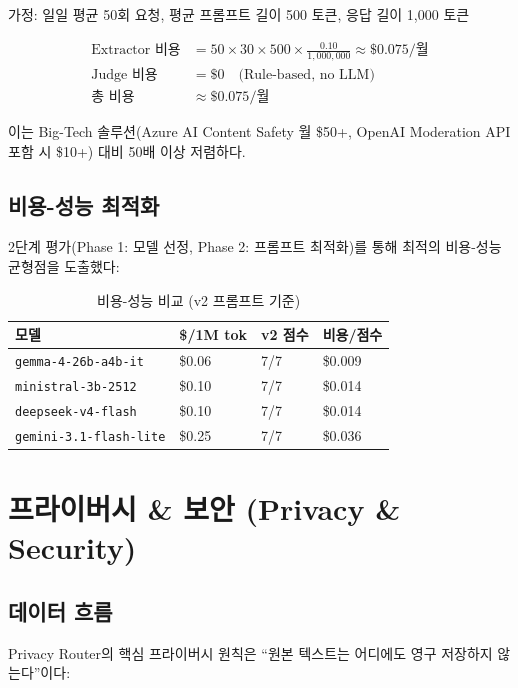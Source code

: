 \documentclass[11pt,a4paper]{article}
\begin{document}
가정: 일일 평균 50회 요청, 평균 프롬프트 길이 500 토큰, 응답 길이 1,000 토큰

\begin{align*}
\text{Extractor 비용} &= 50 \times 30 \times 500 \times \frac{0.10}{1{,}000{,}000} \approx \$0.075/\text{월} \\
\text{Judge 비용} &= \$0 \quad \text{(Rule-based, no LLM)} \\
\text{총 비용} &\approx \$0.075/\text{월}
\end{align*}

이는 Big-Tech 솔루션(Azure AI Content Safety 월 \$50+, OpenAI Moderation API 포함 시 \$10+) 대비 50배 이상 저렴하다.

\subsection{비용-성능 최적화}

2단계 평가(Phase 1: 모델 선정, Phase 2: 프롬프트 최적화)를 통해 최적의 비용-성능 균형점을 도출했다:

\begin{table}[h]
\centering
\begin{tabular}{@{}llll@{}}
\toprule
모델 & \$/1M tok & v2 점수 & 비용/점수 \\
\midrule
\texttt{gemma-4-26b-a4b-it} & \$0.06 & 7/7 & \$0.009 \\
\texttt{ministral-3b-2512} & \$0.10 & 7/7 & \$0.014 \\
\texttt{deepseek-v4-flash} & \$0.10 & 7/7 & \$0.014 \\
\texttt{gemini-3.1-flash-lite} & \$0.25 & 7/7 & \$0.036 \\
\bottomrule
\end{tabular}
\caption{비용-성능 비교 (v2 프롬프트 기준)}
\end{table}

\section{프라이버시 \& 보안 (Privacy \& Security)}

\subsection{데이터 흐름}

Privacy Router의 핵심 프라이버시 원칙은 ``원본 텍스트는 어디에도 영구 저장하지 않는다''이다:
\end{document}
